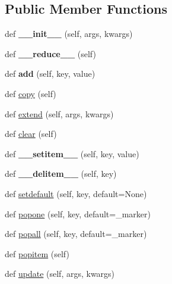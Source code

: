 \subsection*{Public Member Functions}
\begin{DoxyCompactItemize}
\item 
\mbox{\label{classmultidict_1_1__multidict__py_1_1_multi_dict_a926f49dc0b535631861b4a72d5a4aef7}} 
def {\bfseries \+\_\+\+\_\+init\+\_\+\+\_\+} (self, args, kwargs)
\item 
\mbox{\label{classmultidict_1_1__multidict__py_1_1_multi_dict_ae211d8e7ab52b712c603a2989f1a47c9}} 
def {\bfseries \+\_\+\+\_\+reduce\+\_\+\+\_\+} (self)
\item 
\mbox{\label{classmultidict_1_1__multidict__py_1_1_multi_dict_ad99add3e84d60c3d891fac00b4800357}} 
def {\bfseries add} (self, key, value)
\item 
def \hyperlink{classmultidict_1_1__multidict__py_1_1_multi_dict_ab8f33fbf6098ef289b6ea071ef655835}{copy} (self)
\item 
def \hyperlink{classmultidict_1_1__multidict__py_1_1_multi_dict_a40f066b3b4a352c3a60f2c4aaf7f86dd}{extend} (self, args, kwargs)
\item 
def \hyperlink{classmultidict_1_1__multidict__py_1_1_multi_dict_a4507415b8e3ab9113c4580c5ceb24e0e}{clear} (self)
\item 
\mbox{\label{classmultidict_1_1__multidict__py_1_1_multi_dict_a73f3e77cced946a37267a5ab9dad122e}} 
def {\bfseries \+\_\+\+\_\+setitem\+\_\+\+\_\+} (self, key, value)
\item 
\mbox{\label{classmultidict_1_1__multidict__py_1_1_multi_dict_a411b5774130ebdf0d75e9cb04d4026b3}} 
def {\bfseries \+\_\+\+\_\+delitem\+\_\+\+\_\+} (self, key)
\item 
def \hyperlink{classmultidict_1_1__multidict__py_1_1_multi_dict_a29074b22916c8b839261223cdf29be5c}{setdefault} (self, key, default=None)
\item 
def \hyperlink{classmultidict_1_1__multidict__py_1_1_multi_dict_a9134070c0c471813d71190fbf813b03a}{popone} (self, key, default=\+\_\+marker)
\item 
def \hyperlink{classmultidict_1_1__multidict__py_1_1_multi_dict_ab8be640a061be48b7f8026bdb334c952}{popall} (self, key, default=\+\_\+marker)
\item 
def \hyperlink{classmultidict_1_1__multidict__py_1_1_multi_dict_ad5e95bd7ce8046c8ea6c35c6ba6d9714}{popitem} (self)
\item 
def \hyperlink{classmultidict_1_1__multidict__py_1_1_multi_dict_afc0060b5da1db80a6d2e7ec5ec17b1dc}{update} (self, args, kwargs)
\end{DoxyCompactItemize}
